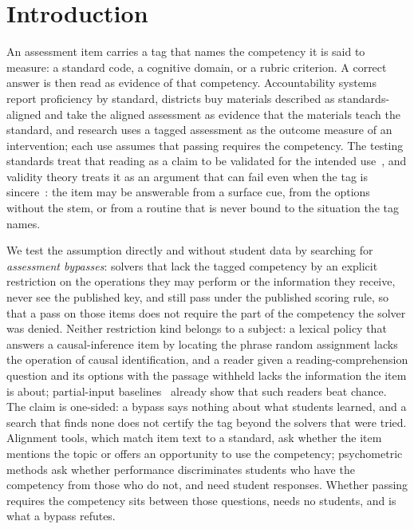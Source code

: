 \section{Introduction}
\label{sec:intro}

An assessment item carries a tag that names the competency it is said to measure: a standard code, a cognitive domain, or a rubric criterion. A correct answer is then read as evidence of that competency. Accountability systems report proficiency by standard, districts buy materials described as standards-aligned and take the aligned assessment as evidence that the materials teach the standard, and research uses a tagged assessment as the outcome measure of an intervention; each use assumes that passing requires the competency. The testing standards treat that reading as a claim to be validated for the intended use~\cite{aera2014standards}, and validity theory treats it as an argument that can fail even when the tag is sincere~\cite{Kane_1992,Kane_2013,Messick_1995}: the item may be answerable from a surface cue, from the options without the stem, or from a routine that is never bound to the situation the tag names.

We test the assumption directly and without student data by searching for \emph{assessment bypasses}: solvers that lack the tagged competency by an explicit restriction on the operations they may perform or the information they receive, never see the published key, and still pass under the published scoring rule, so that a pass on those items does not require the part of the competency the solver was denied. Neither restriction kind belongs to a subject: a lexical policy that answers a causal-inference item by locating the phrase random assignment lacks the operation of causal identification, and a reader given a reading-comprehension question and its options with the passage withheld lacks the information the item is about; partial-input baselines~\cite{kaushik-lipton-2018-much} already show that such readers beat chance. The claim is one-sided: a bypass says nothing about what students learned, and a search that finds none does not certify the tag beyond the solvers that were tried. Alignment tools, which match item text to a standard, ask whether the item mentions the topic or offers an opportunity to use the competency; psychometric methods ask whether performance discriminates students who have the competency from those who do not, and need student responses. Whether passing requires the competency sits between those questions, needs no students, and is what a bypass refutes.

